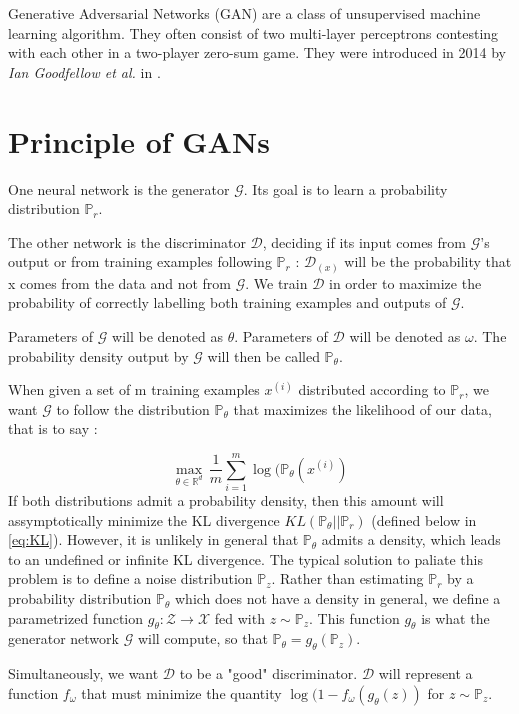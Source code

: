 \documentclass[a4paper]{report}
\newcommand{\G}{\mathcal{G}}
\newcommand{\D}{\mathcal{D}}
\newcommand{\X}{\mathcal{X}}
\newcommand{\Prob}{\mathbb{P}}
\newcommand{\real}{\mathbb{R}}
\theoremstyle{plain}
\theoremstyle{remark}
\theoremstyle{definition}
\begin{document}
Generative Adversarial Networks (GAN) are a class of unsupervised machine learning algorithm. They often consist of two multi-layer perceptrons contesting with each other in a two-player zero-sum game. They were introduced in 2014 by \textit{Ian Goodfellow et al.} in \cite{goodfellow2014generative}.

\section{Principle of GANs}

One neural network is the generator $\G$. Its goal is to learn a probability distribution $\Prob_r$.

The other network is the discriminator $\D$, deciding if its input comes from $\G$'s output or from training examples following $\Prob_r$ : $\D_(x)$ will be the probability that x comes from the data and not from $\G$. We train $\D$ in order to maximize the probability of correctly labelling both training examples and outputs of $\G$.

Parameters of $\G$ will be denoted as $\theta$. Parameters of $\D$ will be denoted as $\omega$.
The probability density output by $\G$ will then be called $\Prob_\theta$.

When given a set of m training examples ${x^{(i)}}$ distributed according to $\Prob_r$, we want $\G$ to follow the distribution $\Prob_{\theta}$ that maximizes the likelihood of our data, that is to say :

\begin{equation}
\label{eq:orig_problem}
\max_{\theta \in \real^d} \, \frac{1}{m} \sum_{i=1}^{m}{\log( \Prob_{\theta}(x^{(i)})}
\end{equation}
If both distributions admit a probability density, then this amount will assymptotically minimize the KL divergence $KL( \Prob_{\theta} || \Prob_r)$ (defined below in \ref{eq:KL}). However, it is unlikely in general that $\Prob_\theta$ admits a density, which leads to an undefined or infinite KL divergence. The typical solution to paliate this problem is to define a noise distribution $\Prob_z$. Rather than estimating $\Prob_r$ by a probability distribution $\Prob_{\theta}$ which does not have a density in general, we define a parametrized function $g_{\theta} : \mathcal{Z} \rightarrow \X$ fed with $ z \sim \Prob_z$. This function $g_{\theta}$ is what the generator network $\G$ will compute, so that $\Prob_\theta = g_\theta(\Prob_z)$.

Simultaneously, we want $\D$ to be a "good" discriminator. $\D$ will represent a function $f_\omega$ that must minimize the quantity $\log(1-f_{\omega}( g_{\theta}(z))$ for $z \sim \Prob_z$. 
\end{document}
